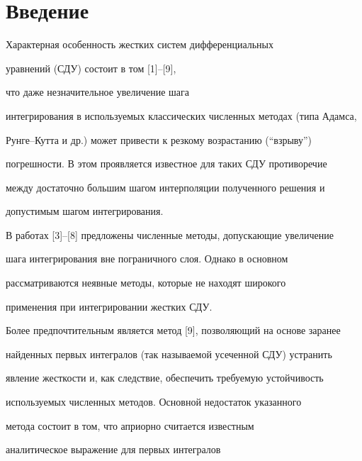 

\maketitle 


\label{begin} 


 


 


\section{Введение} 


 


Характерная особенность жестких систем дифференциальных 


уравнений (СДУ) состоит в том [1]--[9], 


что даже незначительное увеличение шага 


интегрирования в используемых классических численных методах (типа Адамса, 


Рунге--Кутта и др.) может привести к резкому возрастанию (``взрыву'') 


погрешности. В этом проявляется известное для таких СДУ противоречие 


между достаточно большим шагом интерполяции полученного решения и 


допустимым шагом интегрирования. 


В работах [3]--[8] предложены численные методы, допускающие увеличение 


шага интегрирования вне пограничного слоя. Однако в основном 


рассматриваются неявные методы, которые не находят широкого 


применения при интегрировании жестких СДУ. 


Более предпочтительным является метод [9], позволяющий на основе заранее 


найденных первых интегралов (так называемой усеченной СДУ) устранить 


явление жесткости и, как следствие, обеспечить требуемую устойчивость 


используемых численных методов. Основной недостаток указанного 


метода состоит в том, что априорно считается известным 


аналитическое выражение для первых интегралов 



